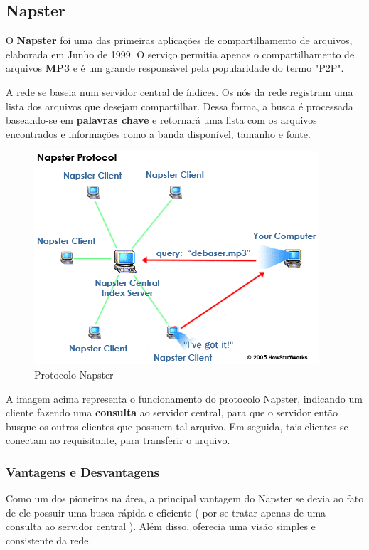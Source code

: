 \documentclass[a4paper]{article}
\begin{document}
\subsection{Napster}
O \textbf{Napster} foi uma das primeiras aplicações de compartilhamento de arquivos, elaborada em Junho de 1999. O serviço permitia apenas o compartilhamento de arquivos \textbf{MP3} e é um grande responsável pela popularidade do termo "P2P".

A rede se baseia num servidor central de índices. Os nós da rede registram uma lista dos arquivos que desejam compartilhar. Dessa forma, a busca é processada baseando-se em \textbf{palavras chave} e retornará uma lista com os arquivos encontrados e informações como a banda disponível, tamanho e fonte. 

\begin{figure}[!h]
\begin{center}
  \includegraphics{img//ilustracaoiot.png} 
  \caption{Protocolo Napster \cite{howstuffworks} \label{figure1}}
\end{center}
\end{figure}

A imagem acima representa o funcionamento do protocolo Napster, indicando um cliente fazendo uma \textbf{consulta} ao servidor central, para que o servidor então busque os outros clientes que possuem tal arquivo. Em seguida, tais clientes se conectam ao requisitante, para transferir o arquivo.

\subsubsection{Vantagens e Desvantagens}
Como um dos pioneiros na área, a principal vantagem do Napster se devia ao fato de ele possuir uma busca rápida e eficiente ( por se tratar apenas de uma consulta ao servidor central ). Além disso, oferecia uma visão simples e consistente da rede. 
\end{document}
